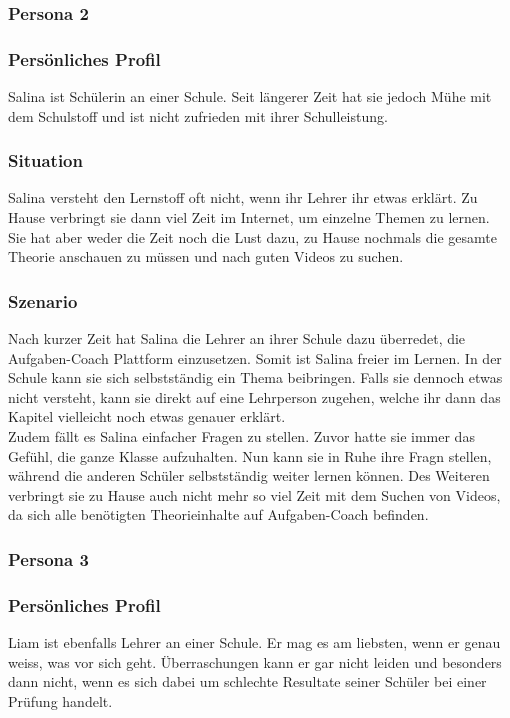 \subsubsection{Persona 2}
\subsubsection*{Persönliches Profil}
Salina ist Schülerin an einer Schule. Seit längerer Zeit hat sie jedoch Mühe mit dem Schulstoff und ist nicht zufrieden mit ihrer Schulleistung.

\subsubsection*{Situation}
Salina versteht den Lernstoff oft nicht, wenn ihr Lehrer ihr etwas erklärt. Zu Hause verbringt sie dann viel Zeit im Internet, um einzelne Themen zu lernen. Sie hat aber weder die Zeit noch die Lust dazu, zu Hause nochmals die gesamte Theorie anschauen zu müssen und nach guten Videos zu suchen.

\subsubsection*{Szenario}
Nach kurzer Zeit hat Salina die Lehrer an ihrer Schule dazu überredet, die Aufgaben-Coach Plattform einzusetzen. Somit ist Salina freier im Lernen. In der Schule kann sie sich selbstständig ein Thema beibringen. Falls sie dennoch etwas nicht versteht, kann sie direkt auf eine Lehrperson zugehen, welche ihr dann das Kapitel vielleicht noch etwas genauer erklärt. \\
Zudem fällt es Salina einfacher Fragen zu stellen. Zuvor hatte sie immer das Gefühl, die ganze Klasse aufzuhalten. Nun kann sie in Ruhe ihre Fragn stellen, während die anderen Schüler selbstständig weiter lernen können. Des Weiteren verbringt sie zu Hause auch nicht mehr so viel Zeit mit dem Suchen von Videos, da sich alle benötigten Theorieinhalte auf Aufgaben-Coach befinden.

\subsubsection{Persona 3}
\subsubsection*{Persönliches Profil}
Liam ist ebenfalls Lehrer an einer Schule. Er mag es am liebsten, wenn er genau weiss, was vor sich geht. Überraschungen kann er gar nicht leiden und besonders dann nicht, wenn es sich dabei um schlechte Resultate seiner Schüler bei einer Prüfung handelt.


